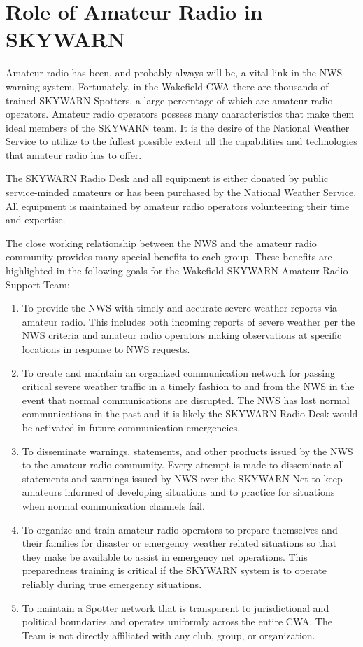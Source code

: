 \documentclass[pdflatex,letterpaper,twoside,12pt]{book}
\begin{document}

\section{Role of Amateur Radio in SKYWARN}

Amateur radio has been, and probably always will be, a vital link in the NWS warning system.  Fortunately, in the Wakefield CWA there are thousands of trained SKYWARN Spotters, a large percentage of which are amateur radio operators.  Amateur radio operators possess many characteristics that make them ideal members of the SKYWARN team.  It is the desire of the National Weather Service to utilize to the fullest possible extent all the capabilities and technologies that amateur radio has to offer.

The SKYWARN Radio Desk and all equipment is either donated by public service-minded amateurs or has been purchased by the National Weather Service.  All equipment is maintained by amateur radio operators volunteering their time and expertise.

The close working relationship between the NWS and the amateur radio community provides many special benefits to each group. These benefits are highlighted in the following goals for the Wakefield SKYWARN Amateur Radio Support Team:

\begin{enumerate}
\item To provide the NWS with timely and accurate severe weather reports via amateur radio. This includes both incoming reports of severe weather per the NWS criteria and amateur radio operators making observations at specific locations in response to NWS requests.
\item To create and maintain an organized communication network for passing critical severe weather traffic in a timely fashion to and from the NWS in the event that normal communications are disrupted.  The NWS has lost normal communications in the past and it is likely the SKYWARN Radio Desk would be activated in future communication emergencies.
\item To disseminate warnings, statements, and other products issued by the NWS to the amateur radio community.  Every attempt is made to disseminate all statements and warnings issued by NWS over the SKYWARN Net to keep amateurs informed of developing situations and to practice for situations when normal communication channels fail.
\item To organize and train amateur radio operators to prepare themselves and their families for disaster or emergency weather related situations so that they make be available to assist in emergency net operations.  This preparedness training is critical if the SKYWARN system is to operate reliably during true emergency situations.
\item To maintain a Spotter network that is transparent to jurisdictional and political boundaries and operates uniformly across the entire CWA.  The Team is not directly affiliated with any club, group, or organization.
\end{enumerate}
\end{document}
